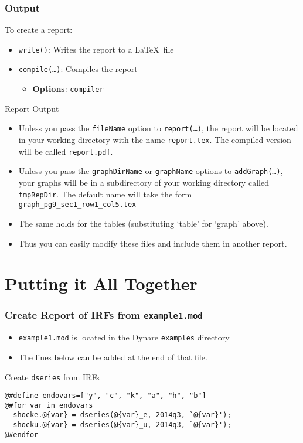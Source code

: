 \documentclass[10pt]{beamer}
\newcommand{\myitem}{\item[$\bullet$]}
\begin{document}
\begin{frame}[fragile,t]
  \frametitle{Output}
  To create a report:
  \begin{itemize}
  \myitem \texttt{write()}: Writes the report to a \LaTeX\ file
  \myitem \texttt{compile(\ldots)}: Compiles the report
    \begin{itemize}
    \myitem \textbf{Options}: \texttt{compiler}
    \end{itemize}
  \end{itemize}
  Report Output
  \begin{itemize}
  \myitem Unless you pass the \texttt{fileName} option to \texttt{report(\ldots)}, the report will be located in your working directory with the name \texttt{report.tex}. The compiled version will be called \texttt{report.pdf}.
  \myitem Unless you pass the \texttt{graphDirName} or \texttt{graphName} options to \texttt{addGraph(\ldots)}, your graphs will be in a subdirectory of your working directory called \texttt{tmpRepDir}. The default name will take the form \texttt{graph\_pg9\_sec1\_row1\_col5.tex}
  \myitem The same holds for the tables (substituting `table' for `graph' above).
  \myitem Thus you can easily modify these files and include them in another report.
  \end{itemize}
\end{frame}


\section{Putting it All Together}
\begin{frame}[fragile=singleslide,t]
  \frametitle{Create Report of IRFs from \texttt{example1.mod}}
  \begin{itemize}
  \myitem \texttt{example1.mod} is located in the Dynare \texttt{examples} directory
  \myitem The lines below can be added at the end of that file.
  \end{itemize}
  \begin{block}{Create \texttt{dseries} from IRFs}
\begin{verbatim}
@#define endovars=["y", "c", "k", "a", "h", "b"]
@#for var in endovars
  shocke.@{var} = dseries(@{var}_e, 2014q3, `@{var}');
  shocku.@{var} = dseries(@{var}_u, 2014q3, `@{var}');
@#endfor
\end{verbatim}
  \end{block}
\end{frame}
\end{document}
